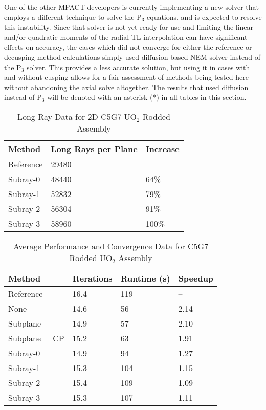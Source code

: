 One of the other MPACT developers is currently implementing a new solver that employs a different technique to solve the P$_3$ equations, and is expected to resolve this instability.  Since that solver is not yet ready for use and limiting the linear and/or quadratic moments of the radial TL interpolation can have significant effects on accuracy, the cases which did not converge for either the reference or decusping method calculations simply used diffusion-based NEM solver instead of the P$_3$ solver.  This provides a less accurate solution, but using it in cases with and without cusping allows for a fair assessment of methods being tested here without abandoning the axial solve altogether.  The results that used diffusion instead of P$_3$ will be denoted with an asterisk (*) in all tables in this section.

\begin{table}[h]
    \centering
    \caption{Long Ray Data for 2D C5G7 UO\texorpdfstring{$_2$}{2} Rodded Assembly}\label{t:subray-data-2dassembly}
    \begin{tabular}{l l l}\toprule
        Method & Long Rays per Plane & Increase \\\midrule
        Reference & 29480 & -- \\
        Subray-0 & 48440 & 64\% \\
        Subray-1 & 52832 & 79\% \\
        Subray-2 & 56304 & 91\% \\
        Subray-3 & 58960 & 100\% \\
        \bottomrule
    \end{tabular}
\end{table}

\begin{table}[h]
    \centering
    \caption{Average Performance and Convergence Data for C5G7 Rodded UO\texorpdfstring{$_2$}{2} Assembly}\label{t:subray-performance-2dassembly}
    \begin{tabular}{l l l l}\toprule
        Method & Iterations & Runtime (s) & Speedup \\\midrule
Reference     & 16.4 & 119 & --   \\
None          & 14.6 & 56 & 2.14 \\
Subplane      & 14.9 & 57 & 2.10 \\
Subplane + CP & 15.2 & 63 & 1.91 \\
Subray-0      & 14.9 & 94 & 1.27  \\
Subray-1      & 15.3 & 104 & 1.15 \\ 
Subray-2      & 15.4 & 109 & 1.09 \\ 
Subray-3      & 15.3 & 107 & 1.11 \\ 
        \bottomrule
    \end{tabular}
\end{table}

